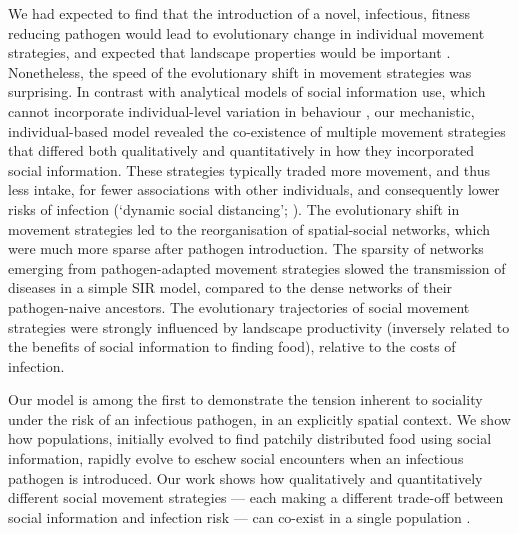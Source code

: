 We had expected to find that the introduction of a novel, infectious, fitness reducing pathogen would lead to evolutionary change in individual movement strategies, and expected that landscape properties would be important \citep{white2018}.
Nonetheless, the speed of the evolutionary shift in movement strategies was surprising.
In contrast with analytical models of social information use, which cannot incorporate individual-level variation in behaviour \citep{romano2020, ashby2021, romano2021}, our mechanistic, individual-based model revealed the co-existence of multiple movement strategies that differed both qualitatively and quantitatively in how they incorporated social information.
These strategies typically traded more movement, and thus less intake, for fewer associations with other individuals, and consequently lower risks of infection (`dynamic social distancing'; \citealt{pusceddu2021}).
The evolutionary shift in movement strategies led to the reorganisation of spatial-social networks, which were much more sparse after pathogen introduction.
The sparsity of networks emerging from pathogen-adapted movement strategies slowed the transmission of diseases in a simple SIR model, compared to the dense networks of their pathogen-naive ancestors.
The evolutionary trajectories of social movement strategies were strongly influenced by landscape productivity (inversely related to the benefits of social information to finding food), relative to the costs of infection.

Our model is among the first to demonstrate the tension inherent to sociality under the risk of an infectious pathogen, in an explicitly spatial context.
We show how populations, initially evolved to find patchily distributed food using social information, rapidly evolve to eschew social encounters when an infectious pathogen is introduced.
Our work shows how qualitatively and quantitatively different social movement strategies --- each making a different trade-off between social information and infection risk --- can co-exist in a single population \citep{gartland2021}.


